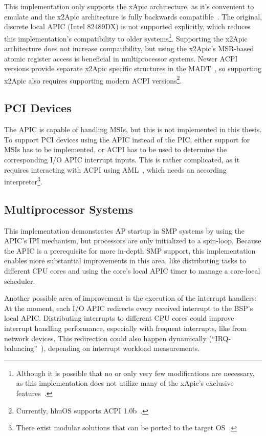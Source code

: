 This implementation only supports the xApic architecture, as it's convenient to emulate and the
x2Apic architecture is fully backwards compatible~\cite[sec.~3.11.12]{ia32}. The original, discrete
local APIC (Intel 82489DX) is not supported explicitly, which reduces this implementation's
compatibility to older systems\footnote{Although it is possible that no or only very few
  modifications are necessary, as this implementation does not utilize many of the xApic's exclusive
  features~\cite[sec.~3.23.27]{ia32}.}. Supporting the x2Apic architecture does not increase
compatibility, but using the x2Apic's MSR-based atomic register access is beneficial in
multiprocessor systems. Newer ACPI versions provide separate x2Apic specific structures in the
MADT~\cite[sec.~5.2.12.12]{acpi65}, so supporting x2Apic also requires supporting modern ACPI
versions\footnote{Currently, hhuOS supports ACPI 1.0b~\cite{acpi1}.}.

\subsection{PCI Devices}
\label{subsec:pcidevices}

The APIC is capable of handling MSIs, but this is not implemented in this thesis. To support PCI
devices using the APIC instead of the PIC, either support for MSIs has to be implemented, or ACPI
has to be used to determine the corresponding I/O APIC interrupt inputs. This is rather
complicated, as it requires interacting with ACPI using AML~\cite[sec.~6.2.13]{acpi65}, which needs
an according interpreter\footnote{There exist modular solutions that can be ported to the target
  OS~\cite{acpica}.}.

\subsection{Multiprocessor Systems}
\label{subsec:multiprocessor}

This implementation demonstrates AP startup in SMP systems by using the APIC's IPI mechanism, but
processors are only initialized to a spin-loop. Because the APIC is a prerequisite for more
in-depth SMP support, this implementation enables more substantial improvements in this area, like
distributing tasks to different CPU cores and using the core's local APIC timer to manage a
core-local scheduler.

Another possible area of improvement is the execution of the interrupt handlers: At the moment,
each I/O APIC redirects every received interrupt to the BSP's local APIC. Distributing interrupts
to different CPU cores could improve interrupt handling performance, especially with frequent
interrupts, like from network devices. This redirection could also happen dynamically
(``IRQ-balancing''~\cite{irqbalance}), depending on interrupt workload measurements.

